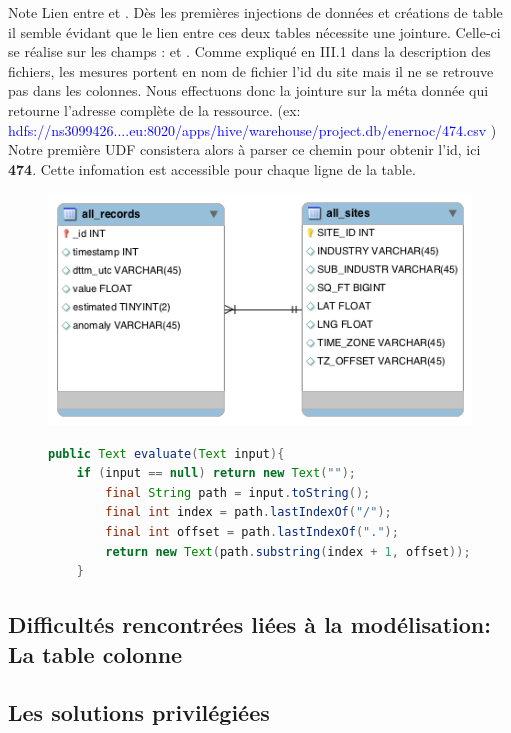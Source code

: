 \begin{block}{Note}
Lien entre  et . Dès les premières injections de données et créations de table il semble évidant que le lien entre ces deux tables nécessite une jointure. Celle-ci se réalise sur les champs :  et . Comme expliqué en III.1 dans la description des fichiers, les mesures portent en nom de fichier l’id du site mais il ne se retrouve pas dans les colonnes. Nous effectuons donc la jointure sur la méta donnée  qui retourne l'adresse complète de la ressource.
(ex: \textcolor{blue}{hdfs://ns3099426....eu:8020/apps/hive/warehouse/project.db/enernoc/474.csv} ) Notre première UDF consistera alors à parser ce chemin pour obtenir l’id, ici \textbf{474}. Cette infomation est accessible pour chaque ligne de la table.
\end{block}

\begin{figure}[h!]
\centering
\includegraphics[scale=0.5]{./image/ER.png}
\begin{lstlisting}[language=java]
public Text evaluate(Text input){
  	if (input == null) return new Text("");
		final String path = input.toString();
		final int index = path.lastIndexOf("/");
		final int offset = path.lastIndexOf(".");
		return new Text(path.substring(index + 1, offset));
	}
\end{lstlisting}
\end{figure}

\subsection{Difficultés rencontrées liées à la modélisation: La table colonne}
\subsection{Les solutions privilégiées}
